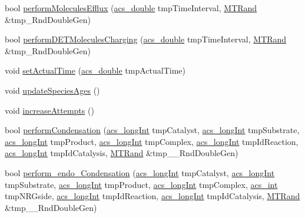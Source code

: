 \begin{DoxyCompactItemize}
bool \hyperlink{classenvironment_acbbcdb4c77231e9ffa4c169e0caa0d0c}{perform\-Molecules\-Efflux} (\hyperlink{acs__headers_8h_ab776853a005fcbf56af0424a2a4dd607}{acs\-\_\-double} tmp\-Time\-Interval, \hyperlink{class_m_t_rand}{M\-T\-Rand} \&tmp\-\_\-\-Rnd\-Double\-Gen)
\item 
bool \hyperlink{classenvironment_adbaf165a12edd62c614a455544807ea3}{perform\-D\-E\-T\-Molecules\-Charging} (\hyperlink{acs__headers_8h_ab776853a005fcbf56af0424a2a4dd607}{acs\-\_\-double} tmp\-Time\-Interval, \hyperlink{class_m_t_rand}{M\-T\-Rand} \&tmp\-\_\-\-Rnd\-Double\-Gen)
\item 
void \hyperlink{classenvironment_a9bc445da3e89d09d4fce11c83f3dedb0}{set\-Actual\-Time} (\hyperlink{acs__headers_8h_ab776853a005fcbf56af0424a2a4dd607}{acs\-\_\-double} tmp\-Actual\-Time)
\item 
void \hyperlink{classenvironment_adab0607255ca5927b69cb6882917e031}{update\-Species\-Ages} ()
\item 
void \hyperlink{classenvironment_aac3eed768b89e3a70017075b68046ede}{increase\-Attempts} ()
\item 
bool \hyperlink{classenvironment_a1baf5512b7e0a8fb6f8f890ba9f99cd1}{perform\-Condensation} (\hyperlink{acs__headers_8h_a19319d75f02db4308bc5c0026d98cd85}{acs\-\_\-long\-Int} tmp\-Catalyst, \hyperlink{acs__headers_8h_a19319d75f02db4308bc5c0026d98cd85}{acs\-\_\-long\-Int} tmp\-Substrate, \hyperlink{acs__headers_8h_a19319d75f02db4308bc5c0026d98cd85}{acs\-\_\-long\-Int} tmp\-Product, \hyperlink{acs__headers_8h_a19319d75f02db4308bc5c0026d98cd85}{acs\-\_\-long\-Int} tmp\-Complex, \hyperlink{acs__headers_8h_a19319d75f02db4308bc5c0026d98cd85}{acs\-\_\-long\-Int} tmp\-Id\-Reaction, \hyperlink{acs__headers_8h_a19319d75f02db4308bc5c0026d98cd85}{acs\-\_\-long\-Int} tmp\-Id\-Catalysis, \hyperlink{class_m_t_rand}{M\-T\-Rand} \&tmp\-\_\-\-\_\-\-Rnd\-Double\-Gen)
\item 
bool \hyperlink{classenvironment_aa7a2cc95d8ba242c805a8fda063b23a7}{perform\-\_\-endo\-\_\-\-Condensation} (\hyperlink{acs__headers_8h_a19319d75f02db4308bc5c0026d98cd85}{acs\-\_\-long\-Int} tmp\-Catalyst, \hyperlink{acs__headers_8h_a19319d75f02db4308bc5c0026d98cd85}{acs\-\_\-long\-Int} tmp\-Substrate, \hyperlink{acs__headers_8h_a19319d75f02db4308bc5c0026d98cd85}{acs\-\_\-long\-Int} tmp\-Product, \hyperlink{acs__headers_8h_a19319d75f02db4308bc5c0026d98cd85}{acs\-\_\-long\-Int} tmp\-Complex, \hyperlink{acs__headers_8h_a8d277355641a098190360234e2ebde35}{acs\-\_\-int} tmp\-N\-R\-Gside, \hyperlink{acs__headers_8h_a19319d75f02db4308bc5c0026d98cd85}{acs\-\_\-long\-Int} tmp\-Id\-Reaction, \hyperlink{acs__headers_8h_a19319d75f02db4308bc5c0026d98cd85}{acs\-\_\-long\-Int} tmp\-Id\-Catalysis, \hyperlink{class_m_t_rand}{M\-T\-Rand} \&tmp\-\_\-\-\_\-\-Rnd\-Double\-Gen)

\end{DoxyCompactItemize}

